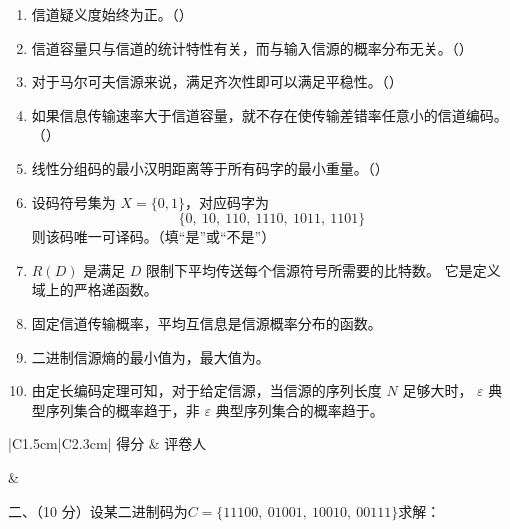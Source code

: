 \documentclass[UTF8,a4paper,12pt]{ctexart}
\newcommand{\blank}[1][3cm]{\underline{\hspace{#1}}}
\begin{document}
\vspace{0.9em}

\begin{enumerate}[label=\arabic*., leftmargin=2em, itemsep=1.45em]

\item 信道疑义度始终为正。\hfill（\qquad）

\item 信道容量只与信道的统计特性有关，而与输入信源的概率分布无关。\hfill（\qquad）

\item 对于马尔可夫信源来说，满足齐次性即可以满足平稳性。\hfill（\qquad）

\item 如果信息传输速率大于信道容量，就不存在使传输差错率任意小的信道编码。\hfill（\qquad）

\item 线性分组码的最小汉明距离等于所有码字的最小重量。\hfill（\qquad）

\item 设码符号集为 $X=\{0,1\}$，对应码字为
\[
\{0,\ 10,\ 110,\ 1110,\ 1011,\ 1101\}
\]
则该码\blank[1.5cm]唯一可译码。（填“是”或“不是”）

\item $R(D)$ 是满足 $D$ 限制下平均传送每个信源符号所需要的\blank[2cm]比特数。
它是定义域上的严格递\blank[1.5cm]函数。

\item 固定信道传输概率，平均互信息是信源概率分布的\blank[2cm]函数。

\item 二进制信源熵的最小值为\blank[2cm]，最大值为\blank[2cm]。

\item 由定长编码定理可知，对于给定信源，当信源的序列长度 $N$ 足够大时，
$\varepsilon$ 典型序列集合的概率趋于\blank[2cm]，非 $\varepsilon$ 典型序列集合的概率趋于\blank[2cm]。

\end{enumerate}

\noindent
\begin{minipage}[t]{0.26\textwidth}
\renewcommand{\arraystretch}{1.5}
\begin{tabular}{|C{1.5cm}|C{2.3cm}|}
\hline
得分 & 评卷人 \\
\hline
\rule{0pt}{0.8cm}&  \\
\hline
\end{tabular}
\end{minipage}
\hspace{0.02\textwidth}
\begin{minipage}[t]{0.68\textwidth}
{\heiti 二、（10 分）}设某二进制码为$C=\{11100,\ 01001,\ 10010,\ 00111\}$求解：
\end{minipage}
\end{document}
